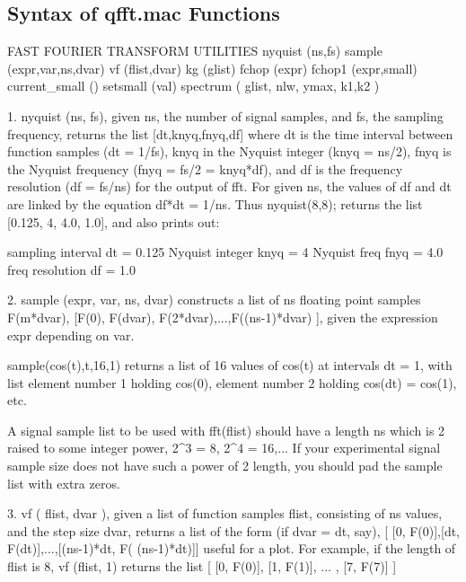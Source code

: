 \documentclass[11pt]{article}
\begin{document}
\subsection{Syntax of \textbf{qfft.mac} Functions}  \label{syntax}
\begin{myVerbatim2s}
   FAST FOURIER TRANSFORM UTILITIES   
    nyquist (ns,fs) 
    sample (expr,var,ns,dvar)
    vf (flist,dvar)
    kg (glist)        
    fchop (expr)
    fchop1 (expr,small)
    current_small ()
    setsmall (val)
    spectrum ( glist, nlw, ymax, k1,k2 )    

	
1.  nyquist (ns, fs), given ns, the number of signal 
    samples, and fs, the sampling frequency,  
    returns the list [dt,knyq,fnyq,df] where dt is the time 
    interval between function samples (dt = 1/fs), knyq in the Nyquist
    integer (knyq = ns/2),  fnyq is the Nyquist frequency 
    (fnyq = fs/2 = knyq*df), and df is the frequency
    resolution (df = fs/ns) for the output of fft.
    For given ns, the values of df and dt are linked
    by the equation df*dt = 1/ns.
	Thus  nyquist(8,8); returns the list
             [0.125, 4, 4.0, 1.0], and also prints out:
       
        sampling interval dt =  0.125 
        Nyquist integer knyq =  4 
        Nyquist freq fnyq =  4.0 
        freq resolution df =  1.0
		
2. sample (expr, var, ns, dvar) constructs a list of ns
   floating point samples F(m*dvar),
   [F(0), F(dvar), F(2*dvar),...,F((ns-1)*dvar) ],
   given the expression expr depending on var.
   
      sample(cos(t),t,16,1) returns a list of 16 values 
      of cos(t) at intervals dt = 1, with list element 
      number 1 holding cos(0), element number 2 holding 
      cos(dt) = cos(1), etc.
	  
	  A signal sample list to be used with fft(flist) should
	  have a length ns which is 2 raised to some integer power,
	  2^3 = 8, 2^4 = 16,... If your experimental signal sample
	  size does not have such a power of 2 length, you should pad
	  the sample list with extra zeros.
	  
3. vf ( flist, dvar ), given a list of function samples flist,
    consisting of ns values, and the step size dvar, returns a
	list of the form (if dvar = dt, say),
   [ [0, F(0)],[dt, F(dt)],...,[(ns-1)*dt, F( (ns-1)*dt)]]
   useful for a plot.
    For example, if the length of flist is 8, vf (flist, 1) returns the list
       [ [0, F(0)], [1, F(1)], ... , [7, F(7)] ]
\end{myVerbatim2s}
\end{document}
